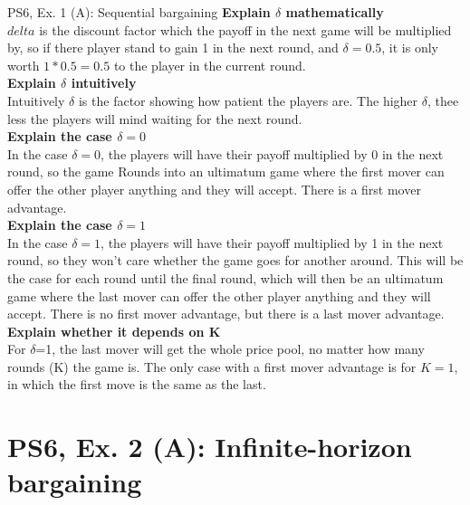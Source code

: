 \begin{frame}{PS6, Ex. 1 (A): Sequential bargaining }
    \textbf{Explain $\delta$ mathematically\\}
    $delta$ is the discount factor which the payoff in the next game will be multiplied by, so if there player stand to gain 1 in the next round, and $\delta=0.5$, it is only worth $1*0.5=0.5$ to the player in the current round.\\
    \textbf{Explain $\delta$ intuitively}\\ Intuitively $\delta$ is the factor showing how patient the players are. The higher $\delta$, thee less the players will mind waiting for the next round.  \\
    \textbf{Explain the case $\delta=0$}\\
    In the case $\delta=0$, the players will have their payoff multiplied by 0 in the next round, so the game Rounds into an ultimatum game where the first mover can offer the other player anything and they will accept. There is a first mover advantage. \\
    \textbf{Explain the case $\delta=1$}\\
    In the case $\delta=1$, the players will have their payoff multiplied by 1 in the next round, so they won't care whether the game goes for another around. This will be the case for each round until the final round, which will then be an ultimatum game where the last mover can offer the other player anything and they will accept. There is no first mover advantage, but there is a last mover advantage. \\
    \textbf{Explain whether it depends on K}\\
    For $\delta$=1, the last mover will get the whole price pool, no matter how many rounds (K) the game is. The only case with a first mover advantage is for $K=1$, in which the first move is the same as the last.\\
    \vfill\null
\end{frame}

\section{PS6, Ex. 2 (A): Infinite-horizon bargaining}


